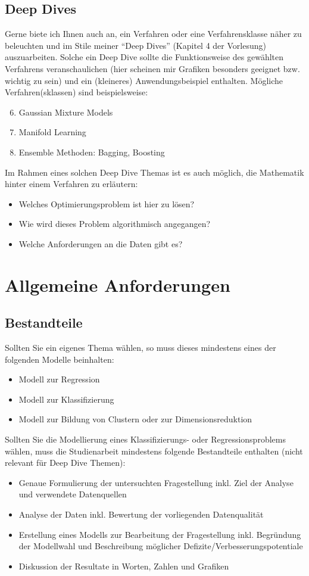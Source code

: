 \documentclass[11pt,a4paper]{article}
\begin{document}
\subsection*{Deep Dives}
Gerne biete ich Ihnen auch an, ein Verfahren oder eine Verfahrensklasse näher zu beleuchten und im Stile  meiner "`Deep Dives"' (Kapitel 4 der Vorlesung) auszuarbeiten. Solche ein Deep Dive sollte die Funktionsweise des gewählten Verfahrens veranschaulichen (hier scheinen mir Grafiken besonders geeignet bzw. wichtig zu sein) und ein (kleineres) Anwendungsbeispiel enthalten. Mögliche Verfahren(sklassen) sind beispielsweise:
\begin{enumerate}
	\setcounter{enumi}{5}
	\item Gaussian Mixture Models
	\item Manifold Learning
	\item Ensemble Methoden: Bagging, Boosting
\end{enumerate}
Im Rahmen eines solchen Deep Dive Themas ist es auch möglich, die Mathematik hinter einem Verfahren zu erläutern:
\begin{itemize}
	\item Welches Optimierungsproblem ist hier zu lösen?
	\item Wie wird dieses Problem algorithmisch angegangen?
	\item Welche Anforderungen an die Daten gibt es?
\end{itemize}

\section*{Allgemeine Anforderungen}
\subsection*{Bestandteile}
Sollten Sie ein eigenes Thema wählen, so muss dieses mindestens eines der folgenden Modelle beinhalten:
\begin{itemize}
	\item Modell zur Regression
	\item Modell zur Klassifizierung
	\item Modell zur Bildung von Clustern oder zur Dimensionsreduktion
\end{itemize}

Sollten Sie die Modellierung eines Klassifizierungs- oder Regressionsproblems wählen, muss die Studienarbeit mindestens folgende Bestandteile enthalten (nicht relevant für Deep Dive Themen):
\begin{itemize}
	\item Genaue Formulierung der untersuchten Fragestellung inkl. Ziel der Analyse und verwendete Datenquellen
	\item Analyse der Daten inkl. Bewertung der vorliegenden Datenqualität
	\item Erstellung eines Modells zur Bearbeitung der Fragestellung inkl. Begründung der Modellwahl und Beschreibung möglicher Defizite/Verbesserungspotentiale
	\item Diskussion der Resultate in Worten, Zahlen und Grafiken
\end{itemize}
\end{document}
